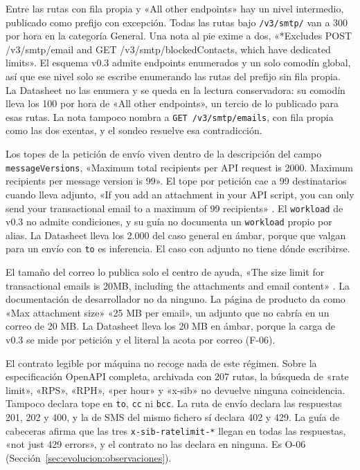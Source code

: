 Entre las rutas con fila propia y «All other endpoints» hay un nivel
intermedio, publicado como prefijo con excepción. Todas las rutas bajo
\texttt{/v3/smtp/} van a 300 por hora en la categoría General. Una nota al pie
exime a dos, «*Excludes POST /v3/smtp/email and GET
/v3/smtp/blockedContacts, which have dedicated limits». El esquema v0.3
admite endpoints enumerados y un solo comodín global, así que ese nivel
solo se escribe enumerando las rutas del prefijo sin fila propia.
La Datasheet no las enumera y se queda en la lectura conservadora: su
comodín lleva los 100 por hora de «All
other endpoints», un tercio de lo publicado para esas rutas. La nota
tampoco nombra a \texttt{GET /v3/smtp/emails}, con fila propia como las
dos exentas, y el sondeo resuelve esa contradicción.

Los topes de la petición de envío viven dentro de la descripción del
campo \texttt{messageVersions}, «Maximum total recipients per API request is
2000. Maximum recipients per message version is 99». El tope por petición
cae a 99 destinatarios cuando lleva adjunto, «If you add an attachment
in your API script, you can only send your transactional email to a
maximum of 99 recipients» \citep{brevohelpadjuntos}. El \texttt{workload} de v0.3 no admite
condiciones, y su guía no documenta un \texttt{workload} propio por alias.
La Datasheet lleva los 2.000 del caso general en ámbar, porque que valgan para un envío con \texttt{to} es inferencia. El caso con adjunto no tiene
dónde escribirse.

El tamaño del correo lo publica solo el centro de ayuda, «The size limit for
transactional emails is 20MB, including the attachments and email
content» \citep{brevohelpadjuntos}. La documentación de desarrollador no da ninguno. La página de
producto \citep{brevoproducto} da como «Max attachment size» «25 MB per email», un adjunto que no
cabría en un correo de 20 MB. La Datasheet lleva los 20 MB en ámbar,
porque la carga de v0.3 se mide por petición y el literal la acota por
correo (F-06).

El contrato legible por máquina no recoge nada de este régimen. Sobre la
especificación OpenAPI completa, archivada con 207 rutas, la búsqueda de
«rate limit», «RPS», «RPH», «per hour» y «x-sib» no devuelve ninguna
coincidencia. Tampoco declara tope en \texttt{to}, \texttt{cc} ni
\texttt{bcc}. La ruta de envío declara las respuestas 201, 202 y 400, y la
de SMS del mismo fichero sí declara 402 y 429. La guía de cabeceras afirma
que las tres \texttt{x-sib-ratelimit-*} llegan en todas las respuestas,
«not just 429 errors», y el contrato no las declara en ninguna. Es O-06 (Sección~\ref{sec:evolucion:observaciones}).

